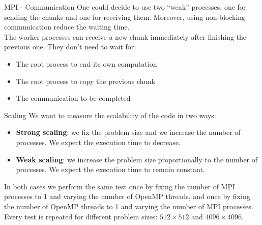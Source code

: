 \begin{frame}[fragile,t]{MPI - Communication}
    One could decide to use two \enquote{weak} processes, one
    for sending the chunks and one for receiving them. Moreover,
    using non-blocking communication reduce the waiting time. \\
    The worker processes can receive a new chunk immediately after
    finishing the previous one. They don't need to wait for:
    \begin{itemize}
        \item The root process to end its own computation
        \item The root process to copy the previous chunk
        \item The communication to be completed
    \end{itemize}
\end{frame}

%
%
\begin{frame}[fragile]{Scaling}
    We want to measure the scalability of the code in two ways:
    \begin{itemize}
        \item \textbf{Strong scaling}: we fix the problem size and
        we increase the number of processes. We expect the execution
        time to decrease.
        \item \textbf{Weak scaling}: we increase the problem size
        proportionally to the number of processes. We expect the
        execution time to remain constant.
    \end{itemize}
    In both cases we perform the same test once by fixing the number
    of MPI processes to 1 and varying the number of OpenMP threads,
    and once by fixing the number of OpenMP threads to 1 and varying
    the number of MPI processes. \\
    Every test is repeated for different problem sizes: $512 \times 512$
    and $4096 \times 4096$.
\end{frame}

